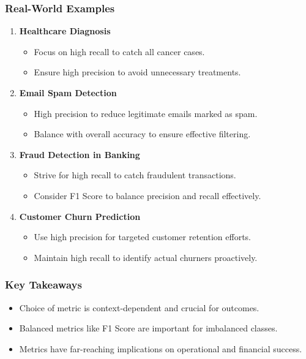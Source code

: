 \documentclass[aspectratio=169]{beamer}
\begin{document}
\begin{frame}[fragile]
    \frametitle{Real-World Examples}
    \begin{enumerate}
        \item \textbf{Healthcare Diagnosis}
        \begin{itemize}
            \item Focus on high recall to catch all cancer cases.
            \item Ensure high precision to avoid unnecessary treatments.
        \end{itemize}
        
        \item \textbf{Email Spam Detection}
        \begin{itemize}
            \item High precision to reduce legitimate emails marked as spam.
            \item Balance with overall accuracy to ensure effective filtering.
        \end{itemize}
        
        \item \textbf{Fraud Detection in Banking}
        \begin{itemize}
            \item Strive for high recall to catch fraudulent transactions.
            \item Consider F1 Score to balance precision and recall effectively.
        \end{itemize}
        
        \item \textbf{Customer Churn Prediction}
        \begin{itemize}
            \item Use high precision for targeted customer retention efforts.
            \item Maintain high recall to identify actual churners proactively.
        \end{itemize}
    \end{enumerate}
\end{frame}

\begin{frame}[fragile]
    \frametitle{Key Takeaways}
    \begin{itemize}
        \item Choice of metric is context-dependent and crucial for outcomes.
        \item Balanced metrics like F1 Score are important for imbalanced classes.
        \item Metrics have far-reaching implications on operational and financial success.
    \end{itemize}
\end{frame}
\end{document}
